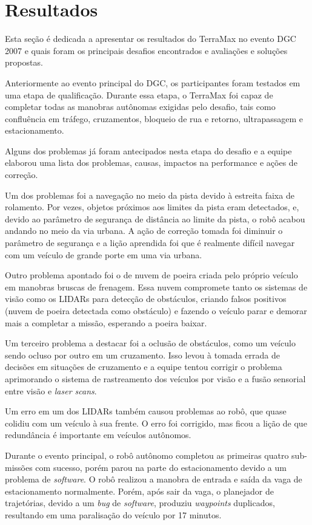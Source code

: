 \section{Resultados}

Esta seção é dedicada a apresentar os resultados do TerraMax no evento DGC 2007 e quais foram os principais desafios encontrados e avaliações e soluções propostas.

Anteriormente ao evento principal do DGC, os participantes foram testados em uma etapa de qualificação. Durante essa etapa, o TerraMax foi capaz de completar todas as manobras autônomas exigidas pelo desafio, tais como confluência em tráfego, cruzamentos, bloqueio de rua e retorno, ultrapassagem e estacionamento.

Alguns dos problemas já foram antecipados nesta etapa do desafio e a equipe elaborou uma lista dos problemas, causas, impactos na performance e ações de correção.

Um dos problemas foi a navegação no meio da pista devido à estreita faixa de rolamento. Por vezes, objetos próximos aos limites da pista eram detectados, e, devido ao parâmetro de segurança de distância ao limite da pista, o robô acabou andando no meio da via urbana. A ação de correção tomada foi diminuir o parâmetro de segurança e a lição aprendida foi que é realmente difícil navegar com um veículo de grande porte em uma via urbana.

Outro problema apontado foi o de nuvem de poeira criada pelo próprio veículo em manobras bruscas de frenagem. Essa nuvem compromete tanto os sistemas de visão como os LIDARs para detecção de obstáculos, criando falsos positivos (nuvem de poeira detectada como obstáculo) e fazendo o veículo parar e demorar mais a completar a missão, esperando a poeira baixar.

Um terceiro problema a destacar foi a oclusão de obstáculos, como um veículo sendo ocluso por outro em um cruzamento. Isso levou à tomada errada de decisões em situações de cruzamento e a equipe tentou corrigir o problema aprimorando o sistema de rastreamento dos veículos por visão e a fusão sensorial entre visão e \emph{laser scans}.

Um erro em um dos LIDARs também causou problemas ao robô, que quase colidiu com um veículo à sua frente. O erro foi corrigido, mas ficou a lição de que redundância é importante em veículos autônomos.

Durante o evento principal, o robô autônomo completou as primeiras quatro sub-missões com sucesso, porém parou na parte do estacionamento devido a um problema de \emph{software}. O robô realizou a manobra de entrada e saída da vaga de estacionamento normalmente. Porém, após sair da vaga, o planejador de trajetórias, devido a um \emph{bug} de \emph{software}, produziu \emph{waypoints} duplicados, resultando em uma paralisação do veículo por 17 minutos.

